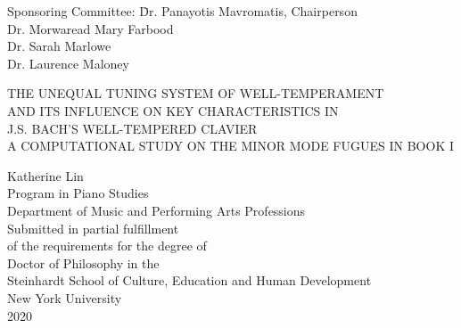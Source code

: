 \documentclass[11pt,letterpaper]{report}
\begin{document}
\title{}
\author{}


\begin{titlepage}
    \thispagestyle{empty}
    \begin{singlespace}\centering\normalsize
        \begin{tabbing}
        \hspace{10ex}Sponsoring Committee: \= Dr. Panayotis Mavromatis, Chairperson\\
        \>Dr. Morwaread Mary Farbood\\
        \>Dr. Sarah Marlowe\\
        \>Dr. Laurence Maloney\\
        \end{tabbing}
        \vspace{1in}
        \begin{doublespace}
            THE UNEQUAL TUNING SYSTEM OF WELL-TEMPERAMENT \\
            AND ITS INFLUENCE ON KEY CHARACTERISTICS IN \\
            J.S. BACH'S WELL-TEMPERED CLAVIER \\
            \vspace{1em}
	    A COMPUTATIONAL STUDY ON THE MINOR MODE FUGUES IN BOOK I
        \end{doublespace}
        \vspace{1in}
        Katherine Lin \\
        \vspace{.25in}
        Program in Piano Studies \\
        Department of Music and Performing Arts Professions\\
        \vfill
        Submitted in partial fulfillment \\
        of the requirements for the degree of \\
        Doctor of Philosophy in the \\
        Steinhardt School of Culture, Education and Human Development \\
        New York University \\
        2020 \\
    \end{singlespace}
\end{titlepage}
\setcounter{page}{2}
\end{document}
